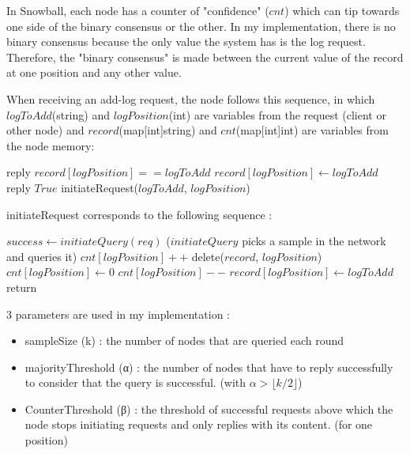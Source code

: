 \documentclass[11pt, twocolumn]{article}
\begin{document}
In Snowball, each node has a counter of "confidence" ($cnt$) which can tip towards one side of the binary consensus or the other. In my implementation, there is no binary consensus because the only value the system has is the log request.
Therefore, the "binary consensus" is made between the current value of the record at one position and any other value.

When receiving an add-log request, the node follows this sequence, in which $logToAdd$(string) and $logPosition$(int) are variables from the request (client or other node) and $record$(map[int]string) and $cnt$(map[int]int) are variables from the node memory:
\\
\begin{algorithmic}
    \State reply $record[logPosition] == logToAdd$
    \Else
    \State $record[logPosition] \gets logToAdd$
    \State reply $True$
    \State initiateRequest($logToAdd$, $logPosition$)
    \EndIf
    \\
\end{algorithmic}
initiateRequest corresponds to the following sequence :
\\
\begin{algorithmic}
    \State $success \gets initiateQuery(req)$
    \State ($initiateQuery$ picks a sample in the network and queries it)
    \State $cnt[logPosition]++$
    \Else
    \State delete($record$, $logPosition$)
    \State $cnt[logPosition] \gets 0$
    \Else
    \State $cnt[logPosition]--$
    \EndIf
    \EndIf
    \State $record[logPosition] \gets logToAdd$
    \State return
    \EndIf
    \EndWhile
    \\
\end{algorithmic}
3 parameters are used in my implementation :
\begin{itemize}
    \item sampleSize (k) : the number of nodes that are queried each round
    \item majorityThreshold (α) : the number of nodes that have to reply successfully to consider that the query is successful.
          (with $\alpha > \lfloor k/2 \rfloor$)
    \item CounterThreshold (β) : the threshold of successful requests above which the node stops initiating requests and only replies with its content. (for one position)
\end{itemize}
\end{document}
